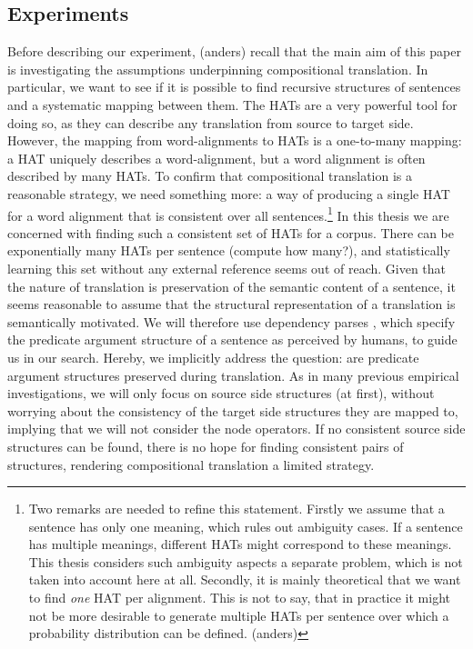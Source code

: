 \documentclass[a4paper, 11pt]{report}
\theoremstyle{definition}
\theoremstyle{plain}
\begin{document}
\subsection{Experiments}

Before describing our experiment, (anders) recall that the main aim of this paper is investigating the assumptions underpinning compositional translation. In particular, we want to see if it is possible to find recursive structures of sentences and a systematic mapping between them. The HATs are a very powerful tool for doing so, as they can describe any translation from source to target side. However, the mapping from word-alignments to HATs is a one-to-many mapping: a HAT uniquely describes a word-alignment, but a word alignment is often described by many HATs. To confirm that compositional translation is a reasonable strategy, we need something more: a way of producing a single HAT for a word alignment that is consistent over all sentences.\footnote{Two remarks are needed to refine this statement. Firstly we assume that a sentence has only one meaning, which rules out ambiguity cases. If a sentence has multiple meanings, different HATs might correspond to these meanings. This thesis considers such ambiguity aspects a separate problem, which is not taken into account here at all. Secondly, it is mainly theoretical that we want to find \textit{one} HAT per alignment. This is not to say, that in practice it might not be more desirable to generate multiple HATs per sentence over which a probability distribution can be defined. (anders)} In this thesis we are concerned with finding such a consistent set of HATs for a corpus. There can be exponentially many HATs per sentence (compute how many?), and statistically learning this set without any external reference seems out of reach. Given that the nature of translation is preservation of the semantic content of a sentence, it seems reasonable to assume that the structural representation of a translation is semantically motivated. We will therefore use dependency parses \citep{schubert1987metataxis}, which specify the predicate argument structure of a sentence as perceived by humans, to guide us in our search. Hereby, we implicitly address the question: are predicate argument structures preserved during translation. As in many previous empirical investigations, we will only focus on source side structures (at first), without worrying about the consistency of the target side structures they are mapped to, implying that we will not consider the node operators. If no consistent source side structures can be found, there is no hope for finding consistent pairs of structures, rendering compositional translation a limited strategy.
\end{document}
